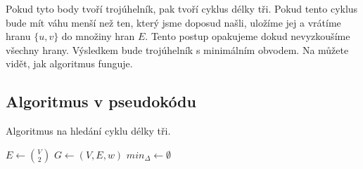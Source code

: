 Pokud tyto body tvoří trojúhelník, pak tvoří cyklus délky tři. Pokud tento cyklus bude mít váhu menší než ten, který jsme doposud našli, uložíme jej a vrátíme hranu $\{u, v\}$ do množiny hran $E$. Tento postup opakujeme dokud nevyzkoušíme všechny hrany. Výsledkem bude trojúhelník s minimálním obvodem. Na  můžete vidět, jak algoritmus funguje.

\subsection{Algoritmus v pseudokódu}
\begin{algorithm}[H]
    \caption{Algoritmus na hledání cyklu délky tři.}
    \label{alg:algoritmus}

   
    \BlankLine
    $ E \leftarrow{\binom{V}{2}}$\;
    $ G \leftarrow (V, E, w)$\;
    $min_{\Delta} \leftarrow \emptyset$\;
    \;
   \end{algorithm}
